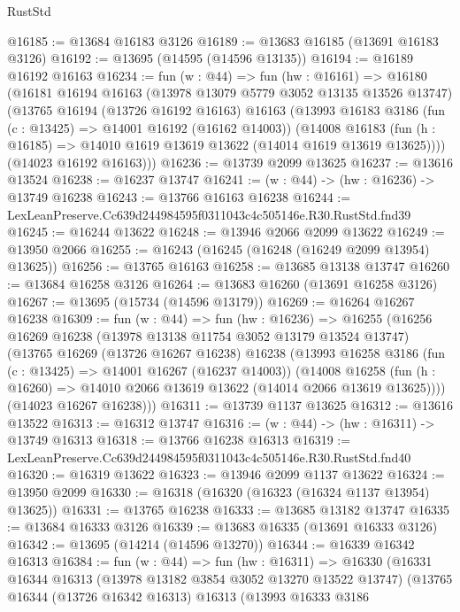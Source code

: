 \begin{lexlean}{RustStd}
\begin{coremodule}
@16185 := @13684 @16183 @3126
@16189 := @13683 @16185 (@13691 @16183 @3126)
@16192 := @13695 (@14595 (@14596 @13135))
@16194 := @16189 @16192 @16163
@16234 := fun (w : @44) =>
  fun (hw : @16161) =>
  @16180
    (@16181
      @16194
      @16163
      (@13978 @13079 @5779 @3052 @13135 @13526 @13747)
      (@13765
        @16194
        (@13726 @16192 @16163)
        @16163
        (@13993
          @16183
          @3186
          (fun (c : @13425) => @14001 @16192 (@16162 @14003))
          (@14008
            @16183
            (fun (h : @16185) => @14010 @1619 @13619 @13622 (@14014 @1619 @13619 @13625))))
        (@14023 @16192 @16163)))
@16236 := @13739 @2099 @13625
@16237 := @13616 @13524
@16238 := @16237 @13747
@16241 := (w : @44) -> (hw : @16236) -> @13749 @16238
@16243 := @13766 @16163 @16238
@16244 := LexLeanPreserve.Cc639d244984595f0311043c4c505146e.R30.RustStd.fnd39
@16245 := @16244 @13622
@16248 := @13946 @2066 @2099 @13622
@16249 := @13950 @2066
@16255 := @16243 (@16245 (@16248 (@16249 @2099 @13954) @13625))
@16256 := @13765 @16163
@16258 := @13685 @13138 @13747
@16260 := @13684 @16258 @3126
@16264 := @13683 @16260 (@13691 @16258 @3126)
@16267 := @13695 (@15734 (@14596 @13179))
@16269 := @16264 @16267 @16238
@16309 := fun (w : @44) =>
  fun (hw : @16236) =>
  @16255
    (@16256
      @16269
      @16238
      (@13978 @13138 @11754 @3052 @13179 @13524 @13747)
      (@13765
        @16269
        (@13726 @16267 @16238)
        @16238
        (@13993
          @16258
          @3186
          (fun (c : @13425) => @14001 @16267 (@16237 @14003))
          (@14008
            @16258
            (fun (h : @16260) => @14010 @2066 @13619 @13622 (@14014 @2066 @13619 @13625))))
        (@14023 @16267 @16238)))
@16311 := @13739 @1137 @13625
@16312 := @13616 @13522
@16313 := @16312 @13747
@16316 := (w : @44) -> (hw : @16311) -> @13749 @16313
@16318 := @13766 @16238 @16313
@16319 := LexLeanPreserve.Cc639d244984595f0311043c4c505146e.R30.RustStd.fnd40
@16320 := @16319 @13622
@16323 := @13946 @2099 @1137 @13622
@16324 := @13950 @2099
@16330 := @16318 (@16320 (@16323 (@16324 @1137 @13954) @13625))
@16331 := @13765 @16238
@16333 := @13685 @13182 @13747
@16335 := @13684 @16333 @3126
@16339 := @13683 @16335 (@13691 @16333 @3126)
@16342 := @13695 (@14214 (@14596 @13270))
@16344 := @16339 @16342 @16313
@16384 := fun (w : @44) =>
  fun (hw : @16311) =>
  @16330
    (@16331
      @16344
      @16313
      (@13978 @13182 @3854 @3052 @13270 @13522 @13747)
      (@13765
        @16344
        (@13726 @16342 @16313)
        @16313
        (@13993
          @16333
          @3186

\end{coremodule}
\end{lexlean}
